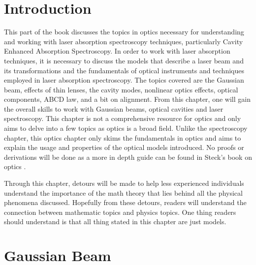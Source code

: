 \documentclass[11pt,a4paper]{book}
\begin{document}
\chapter*{Introduction}
	This part of the book discusses the topics in optics necessary for understanding and working with laser absorption spectroscopy techniques, particularly Cavity Enhanced Absorption Spectroscopy. In order to work with laser absorption techniques, it is necessary to discuss the models that describe a laser beam and its transformations and the fundamentals of optical instruments and techniques employed in laser absorption spectroscopy. The topics covered are the Gaussian beam, effects of thin lenses, the cavity modes, nonlinear optics effects, optical components, ABCD law, and a bit on alignment. From this chapter, one will gain the overall skills to work with Gaussian beams, optical cavities and laser spectroscopy. This chapter is not a comprehensive resource for optics and only aims to delve into a few topics as optics is a broad field. Unlike the spectroscopy chapter, this optics chapter only skims the fundamentals in optics and aims to explain the usage and properties of the optical models introduced. No proofs or derivations will be done as a more in depth guide can be found in Steck's book on optics \cite{steck}.
	
	Through this chapter, detours will be made to help less experienced individuals understand the importance of the math theory that lies behind all the physical phenomena discussed. Hopefully from these detours, readers will understand the connection between mathematic topics and physics topics. One thing readers should understand is that all thing stated in this chapter are just models.


\chapter{Gaussian Beam}
	\label{chp:Gaussian Beam}
	
\end{document}
